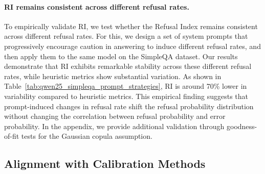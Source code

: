 \documentclass{article} %
\theoremstyle{definition}
\begin{document}

\paragraph{RI remains consistent across different refusal rates.}

To empirically validate RI, we test whether the Refusal Index remains consistent across different refusal rates. 
For this, we design a set of system prompts that progressively encourage caution in answering to induce different refusal rates, and then apply them to the same model on the SimpleQA dataset. 
Our results demonstrate that RI exhibits remarkable stability across these different refusal rates, while heuristic metrics show substantial variation. 
As shown in Table~\ref{tab:qwen25_simpleqa_prompt_strategies}, RI is around 70\% lower in variability compared to heuristic metrics. 
This empirical finding suggests that prompt-induced changes in refusal rate shift the refusal probability distribution without changing the correlation between refusal probability and error probability. 
In the appendix, we provide additional validation through goodness-of-fit tests for the Gaussian copula assumption.


\subsection{Alignment with Calibration Methods}
\end{document}

